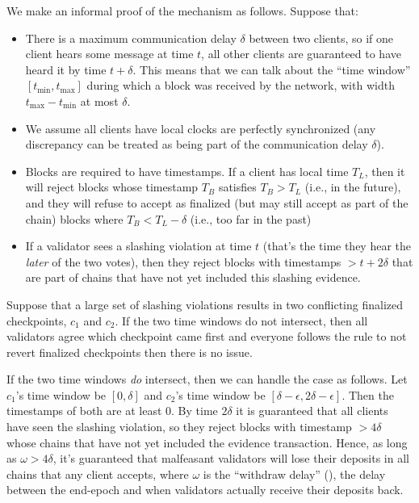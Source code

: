 \documentclass[12pt]{article}
\begin{document}
We make an informal proof of the mechanism as follows. Suppose that:

\begin{itemize}

\item There is a maximum communication delay $\delta$ between two clients, so if one client hears some message at time $t$, all other clients are guaranteed to have heard it by time $t + \delta$. This means that we can talk about the ``time window'' $[t_{\min}, t_{\max}]$ during which a block was received by the network, with width $t_{\max} - t_{\min}$ at most $\delta$.
\item We assume all clients have local clocks are perfectly synchronized (any discrepancy can be treated as being part of the communication delay $\delta$).
\item Blocks are required to have timestamps. If a client has local time $T_L$, then it will reject blocks whose timestamp $T_B$ satisfies $T_B > T_L$ (i.e., in the future), and they will refuse to accept as finalized (but may still accept as part of the chain) blocks where $T_B < T_L - \delta$ (i.e., too far in the past)
\item If a validator sees a slashing violation at time $t$ (that's the time they hear the \emph{later} of the two votes), then they reject blocks with timestamps $> t + 2\delta$ that are part of chains that have not yet included this slashing evidence.
\end{itemize}

Suppose that a large set of slashing violations results in two conflicting finalized checkpoints, $c_1$ and $c_2$.  If the two time windows do not intersect, then all validators agree which checkpoint came first and everyone follows the rule to not revert finalized checkpoints then there is no issue.

If the two time windows \emph{do} intersect, then we can handle the case as follows. Let $c_1$'s time window be $[0, \delta]$ and $c_2$'s  time window be $[\delta - \epsilon, 2\delta - \epsilon]$. Then the timestamps of both are at least $0$. By time $2\delta$ it is guaranteed that all clients have seen the slashing violation, so they reject blocks with timestamp $> 4\delta$ whose chains that have not yet included the evidence transaction. Hence, as long as $\omega > 4\delta$, it's guaranteed that malfeasant validators will lose their deposits in all chains that any client accepts, where $\omega$ is the ``withdraw delay'' (), the delay between the end-epoch and when validators actually receive their deposits back.
\end{document}
